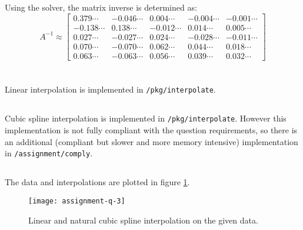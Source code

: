 \documentclass[10pt, a4paper]{article}
\begin{document}
  \subsection{}
  Using the solver, the matrix inverse is determined as:
  \begin{equation}
    A^{-1} \approx \begin{bmatrix}0.379\cdots & -0.046\cdots & 0.004\cdots & -0.004\cdots & -0.001\cdots \\ -0.138\cdots & 0.138\cdots & -0.012\cdots & 0.014\cdots & 0.005\cdots \\ 0.027\cdots & -0.027\cdots & 0.024\cdots & -0.028\cdots & -0.011\cdots \\ 0.070\cdots & -0.070\cdots & 0.062\cdots & 0.044\cdots & 0.018\cdots \\ 0.063\cdots & -0.063\cdots & 0.056\cdots & 0.039\cdots & 0.032\cdots\end{bmatrix}
  \end{equation}

\section{}
  \subsection{}
  Linear interpolation is implemented in \texttt{/pkg/interpolate}.

  \subsection{}
  Cubic spline interpolation is implemented in \texttt{/pkg/interpolate}. However this implementation is
  not fully compliant with the question requirements, so there is an additional (compliant but slower and
  more memory intensive) implementation in \texttt{/assignment/comply}.

  \subsection{}
  The data and interpolations are plotted in figure \ref{fig:interpolate}.

  \begin{figure}[h]
    \centering
    \texttt{[image: assignment-q-3]}
    \caption{Linear and natural cubic spline interpolation on the given data.}
    \label{fig:interpolate}
  \end{figure}
\end{document}
